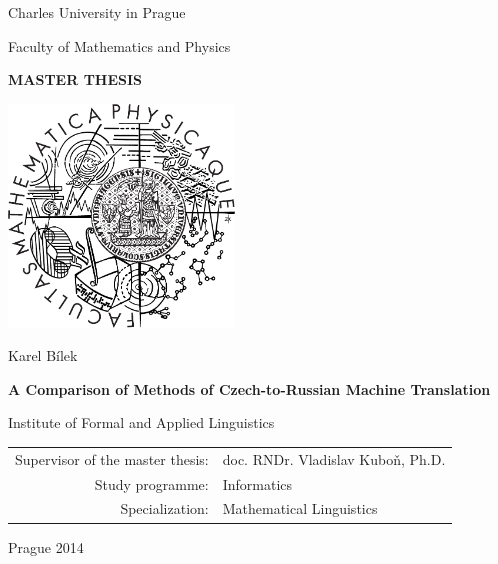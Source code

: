 \documentclass[12pt,a4paper]{report}
\begin{document}


\pagestyle{empty}
\begin{center}

\large

Charles University in Prague

\medskip

Faculty of Mathematics and Physics

\vfill

{\bf\Large MASTER THESIS}

\vfill

\centerline{\mbox{\includegraphics[width=60mm]{../img/logo.pdf}}}

\vfill
\vspace{5mm}

{\LARGE Karel Bílek}

\vspace{15mm}

{\LARGE\bfseries A Comparison of Methods of Czech-to-Russian Machine Translation}

\vfill

Institute of Formal and Applied Linguistics

\vfill

\begin{tabular}{rl}

Supervisor of the master thesis: & doc. RNDr. Vladislav Kuboň, Ph.D. \\
\noalign{\vspace{2mm}}
Study programme: & Informatics \\
\noalign{\vspace{2mm}}
Specialization: & Mathematical Linguistics \\
\end{tabular}

\vfill

Prague 2014

\end{center}
\end{document}
